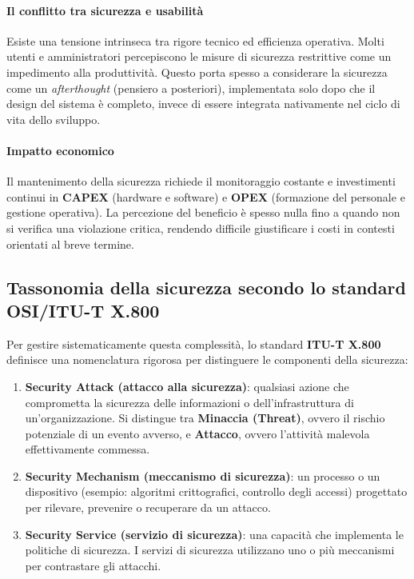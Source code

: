 \paragraph{Il conflitto tra sicurezza e usabilità}

Esiste una tensione intrinseca tra rigore tecnico ed efficienza operativa. Molti
utenti e amministratori percepiscono le misure di sicurezza restrittive come un
impedimento alla produttività. Questo porta spesso a considerare la sicurezza come
un \textit{afterthought} (pensiero a posteriori), implementata solo dopo che il
design del sistema è completo, invece di essere integrata nativamente nel ciclo
di vita dello sviluppo.

\paragraph{Impatto economico}

Il mantenimento della sicurezza richiede il monitoraggio costante e investimenti
continui in \textbf{CAPEX} (hardware e software) e \textbf{OPEX} (formazione del
personale e gestione operativa). La percezione del beneficio è spesso nulla fino
a quando non si verifica una violazione critica, rendendo difficile giustificare
i costi in contesti orientati al breve termine.

\subsection{Tassonomia della sicurezza secondo lo standard OSI/ITU-T X.800}

Per gestire sistematicamente questa complessità, lo standard \textbf{ITU-T X.800}
definisce una nomenclatura rigorosa per distinguere le componenti della sicurezza:

\begin{enumerate}
\item \textbf{Security Attack (attacco alla sicurezza)}: qualsiasi azione che
comprometta la sicurezza delle informazioni o dell'infrastruttura di
un'organizzazione. Si distingue tra \textbf{Minaccia (Threat)}, ovvero il
rischio potenziale di un evento avverso, e \textbf{Attacco}, ovvero l'attività
malevola effettivamente commessa.
\item \textbf{Security Mechanism (meccanismo di sicurezza)}: un processo o un
dispositivo (esempio: algoritmi crittografici, controllo degli accessi)
progettato per rilevare, prevenire o recuperare da un attacco.
\item \textbf{Security Service (servizio di sicurezza)}: una capacità che
implementa le politiche di sicurezza. I servizi di sicurezza utilizzano uno o
più meccanismi per contrastare gli attacchi.
\end{enumerate}

